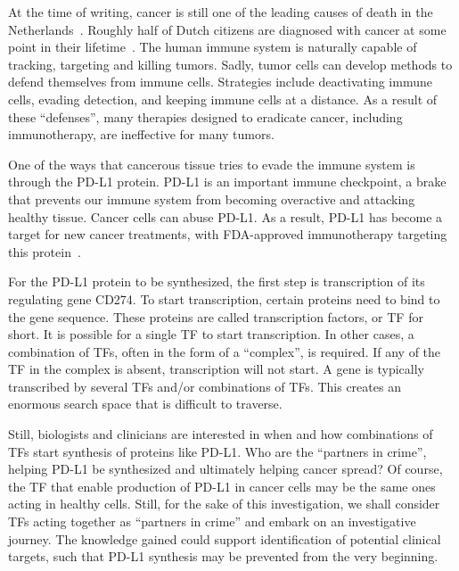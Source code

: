 
At the time of writing, cancer is still one of the leading causes of death in the Netherlands~\cite{noauthor_ranglijsten_nodate}.
Roughly half of Dutch citizens are diagnosed with cancer at some point in their lifetime~\cite{noauthor_kans_nodate}.
The human immune system is naturally capable of tracking, targeting and killing tumors.
Sadly, tumor cells can develop methods to defend themselves from immune cells.
Strategies include deactivating immune cells, evading detection, and keeping immune cells at a distance.
As a result of these ``defenses'', many therapies designed to eradicate cancer, including immunotherapy,
are ineffective for many tumors.

One of the ways that cancerous tissue tries to evade the immune system is through the PD-L1 protein.
PD-L1 is an important immune checkpoint, a brake that prevents our immune system from becoming overactive and attacking
healthy tissue.
Cancer cells can abuse PD-L1.
As a result, PD-L1 has become a target for new cancer treatments, with
FDA-approved immunotherapy targeting this protein~\cite{twomey_cancer_2021}.

For the PD-L1 protein to be synthesized, the first step is transcription of its regulating gene CD274.
To start transcription, certain proteins need to bind to the gene sequence.
These proteins are called transcription factors, or TF for short.
It is possible for a single TF to start transcription.
In other cases, a combination of TFs, often in the form of a ``complex'', is required.
If any of the TF in the complex is absent, transcription will not start.
A gene is typically transcribed by several TFs and/or combinations of TFs.
This creates an enormous search space that is difficult to traverse.

Still, biologists and clinicians are interested in when and how combinations of TFs start synthesis of proteins like PD-L1.
Who are the ``partners in crime'', helping PD-L1 be synthesized and ultimately helping cancer spread?
Of course, the TF that enable production of PD-L1 in cancer cells may be the same ones acting in healthy cells.
Still, for the sake of this investigation, we shall consider TFs acting together as ``partners in crime''
and embark on an investigative journey.
The knowledge gained could support identification of potential clinical targets, such that PD-L1 synthesis
may be prevented from the very beginning.

